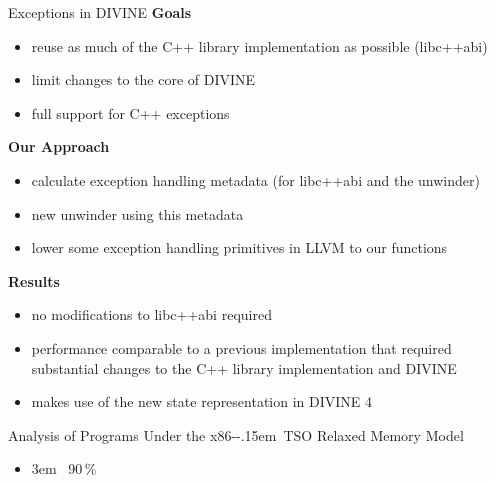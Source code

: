 \documentclass[aspectratio=169, fi]{paradise-slide}
\newcommand{\fcite}[1]{\emergencystretch 3em{\protect\NoHyper\cite{#1}}~\fullcite{#1}}
\newcommand{\xtso}{\mbox{x86-\kern-.15em TSO}\xspace}
\newenvironment{prespart}[1]{%
  \begin{frame}{}%
    \centering
      {\Large #1} \par\bigskip\bigskip%
}{%
  \end{frame}%
}
\begin{document}
\begin{frame}{Exceptions in DIVINE}
  \textbf{Goals}
  \begin{itemize}
    \item reuse as much of the C++ library implementation as possible (libc++abi)
    \item limit changes to the core of DIVINE
    \item full support for C++ exceptions
  \end{itemize}
  \pause

  \bigskip
  \textbf{Our Approach}
  \begin{itemize}
    \item calculate exception handling metadata (for libc++abi and the unwinder)
    \item new unwinder using this metadata
    \item lower some exception handling primitives in LLVM to our functions
  \end{itemize}
  \pause

  \bigskip
  \textbf{Results}
  \begin{itemize}
    \item no modifications to libc++abi required
    \item performance comparable to a previous implementation that required substantial changes to
      the C++ library implementation and DIVINE
    \item makes use of the new state representation in DIVINE 4
  \end{itemize}
\end{frame}

\begin{prespart}{Analysis of Programs Under the \xtso Relaxed Memory Model}
  \begin{itemize}
    \item \fcite{SB2018x86tso} \hfill 90\,\%
  \end{itemize}
\end{prespart}
\end{document}
